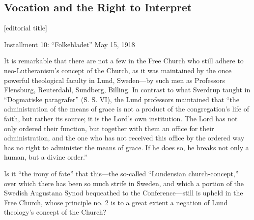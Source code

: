 

\subsection{Vocation and the Right to Interpret} 
[editorial title]

Installment 10: “Folkebladet” May 15, 1918

It is remarkable that there are not a few in the Free Church who still adhere to neo-Lutheranism’s concept of the Church, as it was maintained by the once powerful theological faculty in Lund, Sweden—by such men as Professors Flensburg, Reuterdahl, Sundberg, Billing. In contrast to what Sverdrup taught in “Dogmatiske paragrafer” (S. S. VI), the Lund professors maintained that “the administration of the means of grace is not a product of the congregation’s life of faith, but rather its source; it is the Lord’s own institution. The Lord has not only ordered their function, but together with them an office for their administration, and the one who has not received this office by the ordered way has no right to administer the means of grace. If he does so, he breaks not only a human, but a divine order.”

Is it “the irony of fate” that this—the so-called “Lundensian church-concept,” over which there has been so much strife in Sweden, and which a portion of the Swedish Augustana Synod bequeathed to the Conference—still is upheld in the Free Church, whose principle no. 2 is to a great extent a negation of Lund theology’s concept of the Church?

